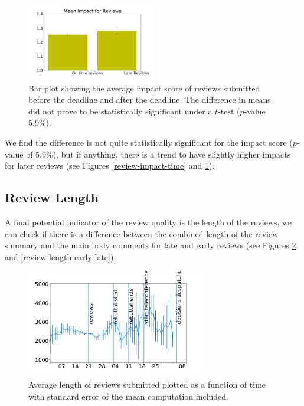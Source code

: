 \begin{figure}[htb]
\centering
\includegraphics[width=0.50\textwidth]{diagrams/neurips/review-impact-early-late.pdf}

\caption{Bar plot showing the average impact score of
reviews submitted before the deadline and after the deadline. The
difference in means did not prove to be statistically significant under
a \(t\)-test (\(p\)-value 5.9\%).} \label{review-impact-early-late}
\end{figure}

We find the difference is not quite statistically significant for the
impact score (\(p\)-value of 5.9\%), but if anything, there is a trend
to have slightly higher impacts for later reviews (see Figures
\ref{review-impact-time} and \ref{review-impact-early-late}).

\subsection{Review Length}\label{review-length}

A final potential indicator of the review quality is the length of the
reviews, we can check if there is a difference between the combined
length of the review summary and the main body comments for late and
early reviews (see Figures \ref{review-length-time} and
\ref{review-length-early-late}).

\begin{figure}[htb]
\centering
\includegraphics[width=0.70\textwidth]{diagrams/neurips/review-length-time.pdf}


\caption{Average length of reviews submitted plotted as a function of time with standard error of the mean computation included.}
\label{review-length-time}
\end{figure}

